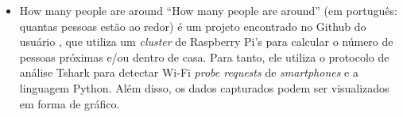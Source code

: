 \begin{itemize}
\item {How many people are around}
``How many people are around'' (em português: quantas pessoas estão ao redor) é um projeto encontrado no Github do usuário , que utiliza um \emph{cluster} de Raspberry Pi's para calcular o número de pessoas próximas e/ou dentro de casa. Para tanto, ele utiliza o protocolo de análise Tshark para detectar Wi-Fi \emph{probe requests} de \emph{smartphones} e a linguagem Python. Além disso, os dados capturados podem ser visualizados em forma de gráfico.

\end{itemize}
